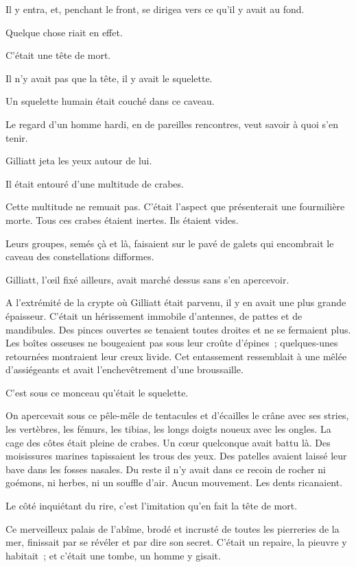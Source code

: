 \documentclass[french,twoside]{book} %
\begin{document}
Il y entra, et, penchant le front, se dirigea vers ce qu’il y avait au fond.\par
Quelque chose riait en effet.\par
C’était une tête de mort.\par
Il n’y avait pas que la tête, il y avait le squelette.\par
Un squelette humain était couché dans ce caveau.\par
 Le regard d’un homme hardi, en de pareilles rencontres, veut savoir à quoi s’en tenir.\par
Gilliatt jeta les yeux autour de lui.\par
Il était entouré d’une multitude de crabes.\par
Cette multitude ne remuait pas. C’était l’aspect que présenterait une fourmilière morte. Tous ces crabes étaient inertes. Ils étaient vides.\par
Leurs groupes, semés çà et là, faisaient sur le pavé de galets qui encombrait le caveau des constellations difformes.\par
Gilliatt, l’œil fixé ailleurs, avait marché dessus sans s’en apercevoir.\par
A l’extrémité de la crypte où Gilliatt était parvenu, il y en avait une plus grande épaisseur. C’était un hérissement immobile d’antennes, de pattes et de mandibules. Des pinces ouvertes se tenaient toutes droites et ne se fermaient plus. Les boîtes osseuses ne bougeaient pas sous leur croûte d’épines ; quelques-unes retournées montraient leur creux livide. Cet entassement ressemblait à une mêlée d’assiégeants et avait l’enchevêtrement d’une broussaille.\par
C’est sous ce monceau qu’était le squelette.\par
On apercevait sous ce pêle-mêle de tentacules et d’écailles le crâne avec ses stries, les vertèbres, les fémurs, les tibias, les longs doigts noueux avec les ongles. La cage des côtes était pleine de crabes. Un cœur quelconque avait battu là. Des moisissures marines tapissaient les trous des yeux. Des patelles avaient laissé leur bave dans les fosses nasales. Du reste il n’y avait dans ce recoin de rocher ni goémons, ni  herbes, ni un souffle d’air. Aucun mouvement. Les dents ricanaient.\par
Le côté inquiétant du rire, c’est l’imitation qu’en fait la tête de mort.\par
Ce merveilleux palais de l’abîme, brodé et incrusté de toutes les pierreries de la mer, finissait par se révéler et par dire son secret. C’était un repaire, la pieuvre y habitait ; et c’était une tombe, un homme y gisait.\par
\end{document}
